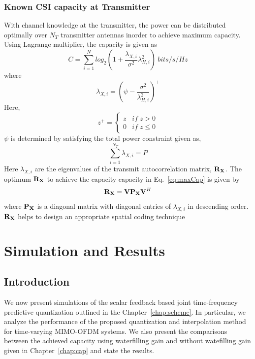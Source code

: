 \documentclass[11pt,a4paper]{report}
\def\bP{{\bf P}}
\def\bR{{\bf R}}
\def\bV{{\bf V}}
\def\bX{{\bf X}}
\begin{document}
\subsection{Known CSI capacity at Transmitter}
With channel knowledge at the transmitter, the power can be distributed
optimally over $N_T$ transmitter antennas inorder to achieve maximum
capacity. Using Lagrange multiplier, the capacity is given as
\begin{equation}
\label{eq:maxCap}
C = \sum_{i=1}^{N}log_{2}\left(1 + \frac{\lambda_{X,i}}{\sigma^2}\lambda^{2}_{H,i}\right)\: bits/s/Hz
\end{equation}
where 
\begin{equation}
\lambda_{X,i} = (\psi - \frac{\sigma^2}{\lambda^2_{H,i}})^{+}
\end{equation}
Here,
\begin{equation}
    z^{+} =
    \begin{cases}
        z & if \;z>0\\
        0 & if \;z\leq0
    \end{cases}
\end{equation}
$\psi$ is determined by satisfying the total power constraint given as,
\begin{equation}
\sum_{i=1}^{N_T}\lambda_{X,i} = P    
\end{equation}
Here $\lambda_{X,i}$ are the eigenvalues of the transmit autocorrelation matrix, $\bR_{\bX}$.
The optimum $\bR_{\bX}$ to achieve the capacity capacity in Eq.~\ref{eq:maxCap}
is given by $$\bR_{\bX} = \bV \bP_\bX \bV^{H}$$ where $\bP_\bX$ is a
diagonal matrix with diagonal entries of $\lambda_{X,i}$ in descending
order. $\bR_\bX$ helps to design an appropriate  spatial coding technique

\chapter{Simulation and Results}

\section{Introduction}
We now present simulations of the scalar feedback based joint
time-frequency predictive quantization outlined in the Chapter~\ref{chap:scheme}. 
In particular, we analyze the performance of the proposed
quantization and interpolation method for time-varying MIMO-OFDM
systems. We also present the comparisons between the achieved capacity
using waterfilling gain and without watefilling gain given in 
Chapter~\ref{chap:cap} and state the results.
\end{document}
